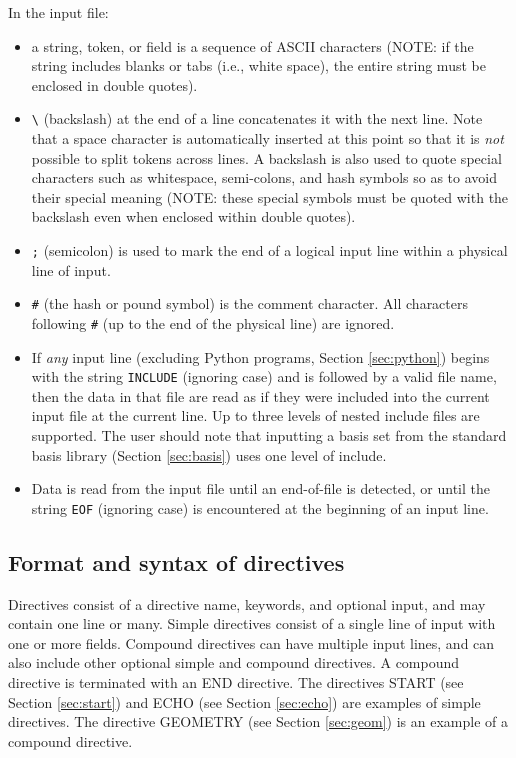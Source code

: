 In the input file:
\begin{itemize}
\item a string, token, or field is a sequence of ASCII characters
  (NOTE: if the string includes blanks or tabs (i.e., white space),
  the entire string must be enclosed in double quotes).
\item \verb+\+ (backslash) at the end of a line concatenates it with
  the next line.  Note that a space character is automatically
  inserted at this point so that it is {\em not} possible to split
  tokens across lines.  A backslash is also used to quote special
  characters such as whitespace, semi-colons, and hash symbols so as
  to avoid their special meaning (NOTE: these special symbols must be
  quoted with the backslash even when enclosed within double quotes).
\item \verb+;+ (semicolon) is used to mark the end of a logical input
  line within a physical line of input.
\item \verb+#+ (the hash or pound symbol) is the comment character.
  All characters following \verb+#+ (up to the end of the physical
  line) are ignored.
\item If {\em any} input line (excluding Python programs, Section
\ref{sec:python}) begins with the string \verb+INCLUDE+ (ignoring
case) and is followed by a valid file name, then the data in that file
are read as if they were included into the current input file at the
current line.  Up to three levels of nested include files are
supported.  The user should note that inputting a basis set from the
standard basis library (Section \ref{sec:basis}) uses one level of
include.
\item Data is read from the input file until an end-of-file is detected, or
until the string \verb+EOF+ (ignoring case) is encountered at the
beginning of an input line.
\end{itemize}

\subsection{Format and syntax of directives}

Directives consist of a directive name, keywords, and optional input,
and may contain one line or many.  Simple directives consist of a
single line of input with one or more fields.  Compound directives can
have multiple input lines, and can also include other optional simple
and compound directives.  A compound directive is terminated with an
END directive.  The directives START (see Section \ref{sec:start}) and
ECHO (see Section \ref{sec:echo}) are examples of simple directives.
The directive GEOMETRY (see Section \ref{sec:geom}) is an example of a
compound directive.

